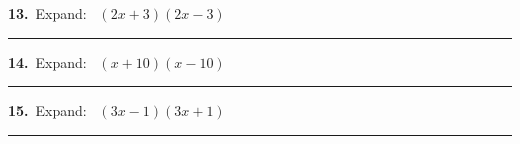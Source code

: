 \documentclass[11pt,letterpaper]{article}
\begin{document}
\needspace{2.2cm}\par\vspace{3mm}\noindent\begin{minipage}[t]{0.48\linewidth}{\color{fmturn}\bfseries 13.}\ Expand: \ $(2x + 3)(2x - 3)$\par\vspace{1.2cm}\hfill\rule{4.2cm}{0.4pt}\end{minipage}\hfill\begin{minipage}[t]{0.48\linewidth}{\color{fmturn}\bfseries 14.}\ Expand: \ $(x + 10)(x - 10)$\par\vspace{1.2cm}\hfill\rule{4.2cm}{0.4pt}\end{minipage}\par
\needspace{2.2cm}\par\vspace{3mm}\noindent\begin{minipage}[t]{0.48\linewidth}{\color{fmturn}\bfseries 15.}\ Expand: \ $(3x - 1)(3x + 1)$\par\vspace{1.2cm}\hfill\rule{4.2cm}{0.4pt}\end{minipage}\hfill\begin{minipage}[t]{0.48\linewidth}\ \end{minipage}\par
\end{document}
